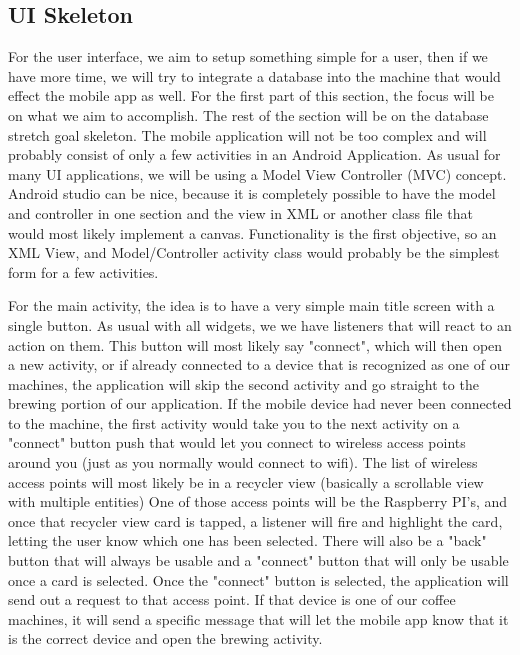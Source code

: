\documentclass[conference]{IEEEtran}
\begin{document}
\subsection{UI Skeleton}
For the user interface, we aim to setup something simple for a user, then if we
have more time, we will try to integrate a database into the machine that would
effect the mobile app as well. For the first part of this section, the focus will be
on what we aim to accomplish. The rest of the section will be on the database
stretch goal skeleton. The mobile application will not be too complex and will
probably consist of only a few activities in an Android Application. As usual
for many UI applications, we will be using a Model View Controller (MVC)     
concept.  Android studio can be nice, because it is completely possible to have
the model and controller in one section and the view in XML or another class
file that would most likely implement a canvas. Functionality is the first
objective, so an XML View, and Model/Controller activity class would probably
be the simplest form for a few activities.

\par For the main activity, the idea is to have a very simple main title screen
with a single button. As usual with all widgets, we we have listeners that will
react to an action on them. This button will most likely say "connect", which
will then open a new activity, or if already connected to a device that is
recognized as one of our machines, the application will skip the second
activity and go straight to the brewing portion of our application. 
If the mobile device had never been connected to the machine, the first
activity would take you to the next activity on a "connect" button push that
would let you connect to wireless access points around you (just as you
normally would connect to wifi). The list of wireless access points will most
likely be in a recycler view (basically a scrollable view with multiple
entities) One of those access points will be the Raspberry PI's, and once that
recycler view card is tapped, a listener will fire and highlight the card,
letting the user know which one has been selected. There will also be a "back"
button that will always be usable and a "connect" button that will only be
usable once a card is selected. Once the "connect" button is selected, the
application will send out a request to that access point. If that device is one
of our coffee machines, it will send a specific message that will let the
mobile app know that it is the correct device and open the brewing activity.
\end{document}
